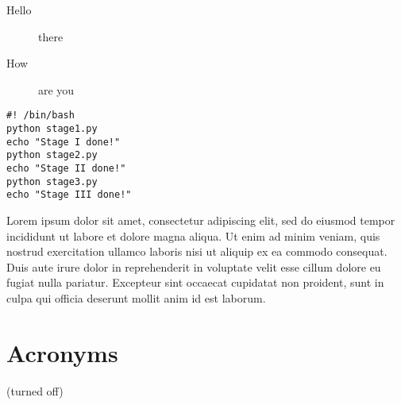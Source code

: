 \documentclass{article}
\begin{document}
\begin{description}
	\item[Hello] there
	\item[How] are you
\end{description}

\begin{lstlisting}[label={list:second},caption=Sample Bash code.]
#! /bin/bash
python stage1.py
echo "Stage I done!"
python stage2.py
echo "Stage II done!"
python stage3.py
echo "Stage III done!"
\end{lstlisting}

Lorem ipsum dolor sit amet, consectetur adipiscing elit, sed do eiusmod tempor
incididunt ut labore et dolore magna aliqua. Ut enim ad minim veniam, quis
nostrud exercitation ullamco laboris nisi ut aliquip ex ea commodo consequat.
Duis aute irure dolor in reprehenderit in voluptate velit esse cillum dolore eu
fugiat nulla pariatur. Excepteur sint occaecat cupidatat non proident, sunt in
culpa qui officia deserunt mollit anim id est laborum.

\lstlistoflistings

\section{Acronyms}
 (turned off)

\end{document}
